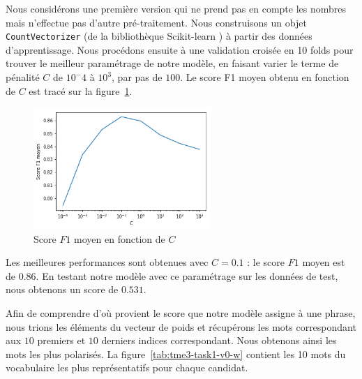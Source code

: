 \documentclass[a4paper]{article}
\newcommand{\figref}[1]{figure~\ref{#1}}
\begin{document}
Nous considérons une première version qui ne prend pas en compte les nombres
mais n'effectue pas d'autre pré-traitement. Nous construisons un objet
\texttt{CountVectorizer} (de la bibliothèque Scikit-learn \cite{scikit}) à
partir des données d'apprentissage. Nous procédons ensuite à une validation
croisée en 10 folds pour trouver le meilleur paramétrage de notre modèle, en
faisant varier le terme de pénalité $C$ de $10^-4$ à $10^3$, par pas de $100$.
Le score F1 moyen obtenu en fonction de $C$ est tracé sur la
\figref{img:tme2-task1-v0}.

\begin{figure}[H]
	\center 
	\includegraphics[width=0.6\textwidth]{images/tme2/task1_v0.png}
    \caption{Score $F1$ moyen en fonction de $C$}
    \label{img:tme2-task1-v0}
\end{figure}

Les meilleures performances sont obtenues avec $C=0.1$ : le score $F1$ moyen est
de $0.86$. En testant notre modèle avec ce paramétrage sur les données de test,
nous obtenons un score de $0.531$. 

Afin de comprendre d'où provient le score que notre modèle assigne à une phrase,
nous trions les éléments du vecteur de poids et récupérons les mots
correspondant aux $10$ premiers et $10$ derniers indices correspondant. Nous
obtenons ainsi les mots les plus polarisés. La \figref{tab:tme3-task1-v0-w}
contient les 10 mots du vocabulaire les plus représentatifs pour chaque
candidat.

\begin{table}[H]
\centering
{}
\caption{10 unigrammes les plus polarisés pour J. Chirac et F. Mitterrand}
\label{tab:tme3-task1-v0-w}
\end{table}
\end{document}

